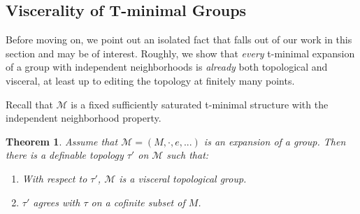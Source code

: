 \documentclass{amsart}
\newtheorem{theorem}{Theorem}[section]
\theoremstyle{definition}
\begin{document}
\subsection{Viscerality of T-minimal Groups}

Before moving on, we point out an isolated fact that falls out of our work in this section and may be of interest. Roughly, we show that \textit{every} t-minimal expansion of a group with independent neighborhoods is \textit{already} both topological and visceral, at least up to editing the topology at finitely many points. 

Recall that $\mathcal M$ is a fixed sufficiently saturated t-minimal structure with the independent neighborhood property.

\begin{theorem}\label{T: the group is visceral}
    Assume that $\mathcal M=(M,\cdot,e,...)$ is an expansion of a group. Then there is a definable topology $\tau'$ on $\mathcal M$ such that:
    \begin{enumerate}
        \item With respect to $\tau'$, $\mathcal M$ is a visceral topological group.
        \item $\tau'$ agrees with $\tau$ on a cofinite subset of $M$.
    \end{enumerate}
\end{theorem}
\end{document}
